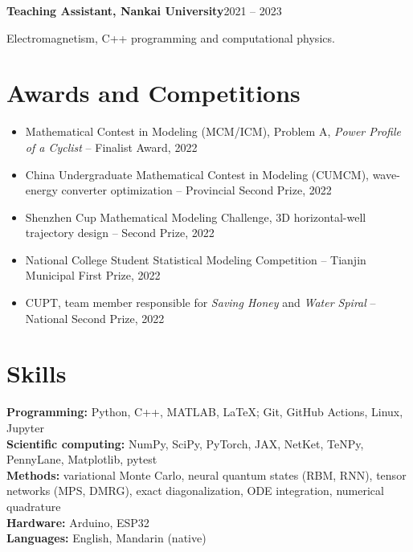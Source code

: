 \documentclass[11pt,letterpaper]{article}
\newcommand{\entry}[2]{\par\noindent\textbf{#1}\hfill #2\par}
\begin{document}
\vspace{5pt}
\entry{Teaching Assistant, Nankai University}{2021 -- 2023}
Electromagnetism, C++ programming and computational physics.

\section{Awards and Competitions}
\begin{itemize}
  \item Mathematical Contest in Modeling (MCM/ICM), Problem A, \textit{Power Profile of a Cyclist} -- Finalist Award, 2022
  \item China Undergraduate Mathematical Contest in Modeling (CUMCM), wave-energy converter optimization -- Provincial Second Prize, 2022
  \item Shenzhen Cup Mathematical Modeling Challenge, 3D horizontal-well trajectory design -- Second Prize, 2022
  \item National College Student Statistical Modeling Competition -- Tianjin Municipal First Prize, 2022
  \item CUPT, team member responsible for \textit{Saving Honey} and \textit{Water Spiral} -- National Second Prize, 2022
\end{itemize}

\section{Skills}
\textbf{Programming:} Python, C++, MATLAB, LaTeX; Git, GitHub Actions, Linux, Jupyter\\
\textbf{Scientific computing:} NumPy, SciPy, PyTorch, JAX, NetKet, TeNPy, PennyLane, Matplotlib, pytest\\
\textbf{Methods:} variational Monte Carlo, neural quantum states (RBM, RNN), tensor networks (MPS, DMRG),
exact diagonalization, ODE integration, numerical quadrature\\
\textbf{Hardware:} Arduino, ESP32\\
\textbf{Languages:} English, Mandarin (native)
\end{document}
